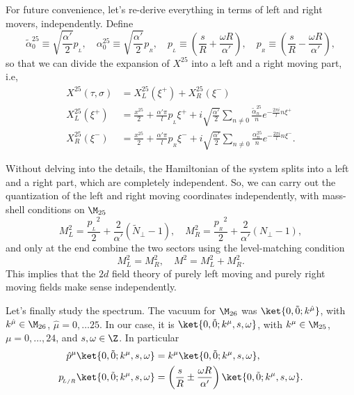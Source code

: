 For future convenience, let's re-derive everything in terms of left and right movers, independently. Define
\begin{equation}\label{eq:pl-pr-def}
    \tilde{\alpha}^{25}_0 \equiv \sqrt{\frac{\alpha'}{2}} p_{\!_L}, \quad {\alpha}^{25}_0 \equiv \sqrt{\frac{\alpha'}{2}} p_{\!_R}, \quad p_{\!_L} \equiv \left( \frac{s}{R} + \frac{\omega R}{\alpha'} \right), \quad p_{\!_R} \equiv \left( \frac{s}{R} - \frac{\omega R}{\alpha'} \right) ,
\end{equation}
so that we can divide the expansion of $X^{25}$ into a left and a right moving part, i.e,
\begin{subequations}\label{eq:expansion-x-25}
\begin{align}
    X^{25}(\tau,\sigma) &= X^{25}_L(\xi^+) + X^{25}_R(\xi^-) \\
    X^{25}_L(\xi^+)     &= \frac{x^{25}}{2} + \frac{\alpha' \pi}{l} p_{\!_L} \xi^+ + i \sqrt{\frac{\alpha'}{2}} \sum_{n\neq 0} \frac{\tilde{\alpha}^{25}_n}{n}e^{-\frac{2\pi i}{l}n \xi^+} \\
    X^{25}_R(\xi^-)     &= \frac{x^{25}}{2} + \frac{\alpha' \pi}{l} p_{\!_R} \xi^- + i \sqrt{\frac{\alpha'}{2}} \sum_{n\neq 0} \frac{{\alpha}^{25}_n}{n}e^{-\frac{2\pi i}{l}n \xi^-}.
\end{align}
\end{subequations}

Without delving into the details, the Hamiltonian of the system splits into a left and a right part, which are completely independent. So, we can carry out the quantization of the left and right moving coordinates independently, with mass-shell conditions on $\M_{25}$
\begin{equation}\label{eq:left-right-mass-shell}
    M^2_L = \frac{{p_{\!_L}}^2}{2} + \frac{2}{\alpha'}(\tilde{N}_\perp-1), \quad M^2_R = \frac{{p_{\!_R}}^2}{2} + \frac{2}{\alpha'}({N}_\perp-1),
\end{equation}
and only at the end combine the two sectors using the level-matching condition
\begin{equation}
    M^2_L = M^2_R, \quad M^2 = M^2_L + M^2_R .
\end{equation}
This implies that the $2d$ field theory of purely left moving and purely right moving fields make sense independently.

Let's finally study the spectrum. The vacuum for $\M_{26}$ was $\ket{0,\tilde{0}; k^{\hat{\mu}}}$, with $k^{\hat{\mu}} \in \M_{26}$, $\hat{\mu} = 0, \dots 25$. In our case, it is $\ket{0,\tilde{0}; k^\mu, s, \omega}$, with $k^\mu \in \M_{25}$, $\mu = 0, \dots, 24$, and $s,\omega \in \Z$. In particular
\begin{equation}
\begin{aligned}
    \hat{p}^\mu \ket{0,\tilde{0}; k^\mu, s, \omega} &= k^\mu \ket{0,\tilde{0}; k^\mu, s, \omega} ,\\ 
    p_{\!_{L/R}}\ket{0,\tilde{0}; k^\mu, s, \omega} &= \left( \frac{s}{R} \pm \frac{\omega R}{\alpha'} \right) \ket{0,\tilde{0}; k^\mu, s, \omega}.
\end{aligned}
\end{equation}

